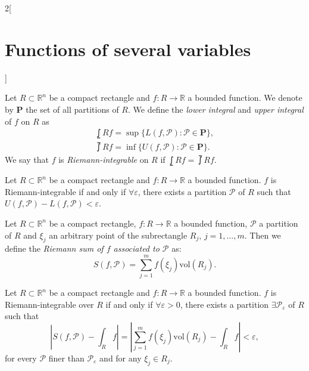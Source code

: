 \documentclass[class=article,10pt,crop=false]{standalone}
\begin{document}
\begin{multicols}{2}[\section{Functions of several variables}]
\begin{definition}
Let $R\subset\mathbb{R}^n$ be a compact rectangle and $f:R\rightarrow\mathbb{R}$ a bounded function. We denote by $\textbf{P}$ the set of all partitions of $R$. We define the \textit{lower integral} and \textit{upper integral} of $f$ on $R$ as 
\begin{gather*}
    \lowint{R}{}f=\sup\{L(f,\mathcal{P}):\mathcal{P}\in\textbf{P}\},\\
    \upint{R}{}f=\inf\{U(f,\mathcal{P}):\mathcal{P}\in\textbf{P}\}.
\end{gather*} We say that $f$ is \textit{Riemann-integrable} on $R$ if $\displaystyle\lowint{R}{}f=\upint{R}{}f$.
\end{definition}
\begin{prop}
Let $R\subset\mathbb{R}^n$ be a compact rectangle and $f:R\rightarrow\mathbb{R}$ a bounded function. $f$ is Riemann-integrable if and only if $\forall\varepsilon$, there exists a partition $\mathcal{P}$ of $R$ such that $U(f,\mathcal{P})-L(f,\mathcal{P})<\varepsilon$.
\end{prop}
\begin{definition}
Let $R\subset\mathbb{R}^n$ be a compact rectangle, $f:R\rightarrow\mathbb{R}$ a bounded function, $\mathcal{P}$ a partition of $R$ and $\xi_j$ an arbitrary point of the subrectangle $R_j$, $j=1,\ldots,m$. Then we define the \textit{Riemann sum of $f$ associated to $\mathcal{P}$} as: $$S(f,\mathcal{P})=\sum_{j=1}^mf(\xi_j)\text{vol}(R_j).$$
\end{definition}
\begin{theorem}
Let $R\subset\mathbb{R}^n$ be a compact rectangle and $f:R\rightarrow\mathbb{R}$ a bounded function. $f$ is Riemann-integrable over $R$ if and only if $\forall\varepsilon>0$, there exists a partition $\exists\mathcal{P}_\varepsilon$ of $R$ such that $$\left|S(f,\mathcal{P})-\int_Rf\right|=\left|\sum_{j=1}^mf(\xi_j)\text{vol}(R_j)-\int_Rf\right|<\varepsilon,$$ for every $\mathcal{P}$ finer than $\mathcal{P}_\varepsilon$ and for any $\xi_j\in R_j$.
\end{theorem}

\end{multicols}
\end{document}
